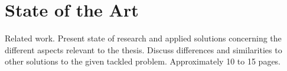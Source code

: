 \chapter{State of the Art}
Related work. Present state of research and applied solutions concerning the different aspects relevant to the thesis. Discuss differences and similarities to other solutions to the given tackled problem. Approximately 10 to 15 pages.